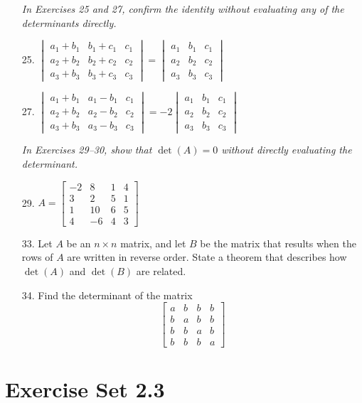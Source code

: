 \documentclass{article}
\theoremstyle{mystyle}
\begin{document}
\begin{enumerate}
\noindent\textit{In Exercises 25 and 27, confirm the identity without evaluating any of the determinants directly.}

\item[25.] $\begin{vmatrix}a_1+b_1&b_1+c_1&c_1\\a_2+b_2&b_2+c_2&c_2\\a_3+b_3&b_3+c_3&c_3\end{vmatrix}=\begin{vmatrix}a_1&b_1&c_1\\a_2&b_2&c_2\\a_3&b_3&c_3\end{vmatrix}$

\item[27.] $\begin{vmatrix}a_1+b_1&a_1-b_1&c_1\\a_2+b_2&a_2-b_2&c_2\\a_3+b_3&a_3-b_3&c_3\end{vmatrix}=-2\begin{vmatrix}a_1&b_1&c_1\\a_2&b_2&c_2\\a_3&b_3&c_3\end{vmatrix}$

\noindent\textit{In Exercises 29--30, show that $\det(A)=0$ without directly evaluating the determinant.}

\item[29.] $A=\begin{bmatrix}-2&8&1&4\\3&2&5&1\\1&10&6&5\\4&-6&4&3\end{bmatrix}$

\item[33.] Let $A$ be an $n\times n$ matrix, and let $B$ be the matrix that results when the rows of $A$ are written in reverse order. State a theorem that describes how $\det(A)$ and $\det(B)$ are related.

\item[34.] Find the determinant of the matrix
\[
\begin{bmatrix}a&b&b&b\\b&a&b&b\\b&b&a&b\\b&b&b&a\end{bmatrix}
\]
\end{enumerate}

\section*{Exercise Set 2.3}
\end{document}
